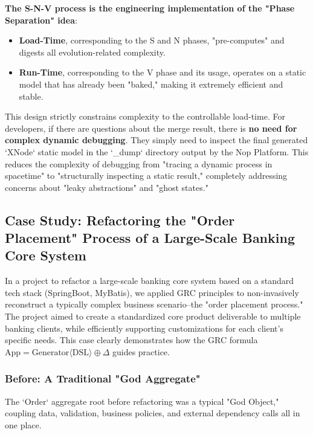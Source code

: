 \documentclass[11pt]{article}
\begin{document}
\textbf{The S-N-V process is the engineering implementation of the "Phase Separation" idea}:
\begin{itemize}
    \item \textbf{Load-Time}, corresponding to the S and N phases, "pre-computes" and digests all evolution-related complexity.
    \item \textbf{Run-Time}, corresponding to the V phase and its usage, operates on a static model that has already been "baked," making it extremely efficient and stable.
\end{itemize}

This design strictly constrains complexity to the controllable load-time. For developers, if there are questions about the merge result, there is \textbf{no need for complex dynamic debugging}. They simply need to inspect the final generated `XNode` static model in the `\_dump` directory output by the Nop Platform. This reduces the complexity of debugging from "tracing a dynamic process in spacetime" to "structurally inspecting a static result," completely addressing concerns about "leaky abstractions" and "ghost states."

\subsection{Case Study: Refactoring the "Order Placement" Process of a Large-Scale Banking Core System}

In a project to refactor a large-scale banking core system based on a standard tech stack (SpringBoot, MyBatis), we applied GRC principles to non-invasively reconstruct a typically complex business scenario--the "order placement process." The project aimed to create a standardized core product deliverable to multiple banking clients, while efficiently supporting customizations for each client's specific needs. This case clearly demonstrates how the GRC formula $\text{App} = \text{Generator}\langle\text{DSL}\rangle \oplus \Delta$ guides practice.

\subsubsection*{Before: A Traditional "God Aggregate"}

The `Order` aggregate root before refactoring was a typical "God Object," coupling data, validation, business policies, and external dependency calls all in one place.
\end{document}
